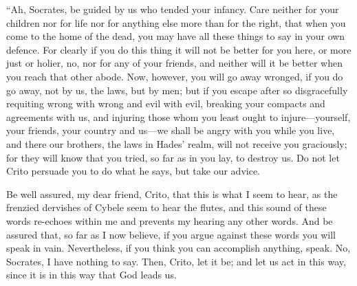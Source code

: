 \documentclass[letterpaper,12pt]{article}
\begin{document}
\begin{drama}
\par
\vspace{0.3em}
``Ah, Socrates, be guided by us who tended your infancy. Care neither for your children nor for life nor for anything else more than for the right, that when you come to the home of the dead, you may have all these things to say in your own defence. For clearly if you do this thing it will not be better for you here, or more just or holier, no, nor for any of your friends, and neither will it be better when you reach that other abode. Now, however, you will go away wronged, if you do go away, not by us,  the laws, but by men; but if you escape after so disgracefully requiting wrong with wrong and evil with evil, breaking your compacts and agreements with us, and injuring those whom you least ought to injure---yourself, your friends, your country and us---we shall be angry with you while you live, and there our brothers, the laws in Hades' realm, will not receive you graciously; for they will know that you tried, so far as in you lay, to destroy us. Do not let Crito persuade you to do  what he says, but take our advice.
\par
\vspace{0.3em}
Be well assured, my dear friend, Crito, that this is what I seem to hear, as the frenzied dervishes of Cybele seem to hear the flutes, and this sound of these words re-echoes within me and prevents my hearing any other words. And be assured that, so far as I now believe, if you argue against these words you will speak in vain. Nevertheless, if you think you can accomplish anything, speak.
\critospeaks 
No, Socrates, I have nothing to say. 
\socratesspeaks 
Then, Crito, let it be; and let us act in this way, since it is in this way that God leads us.


\end{drama}
\end{document}
